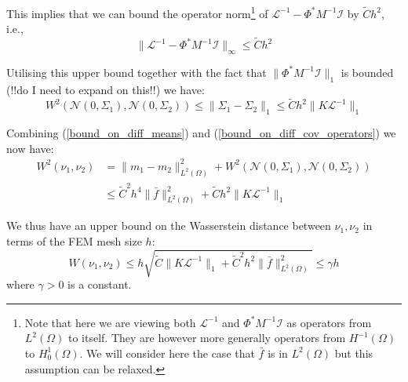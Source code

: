 This implies that we can bound the operator norm\footnote{Note that here we are viewing both $\mathcal{L}^{-1}$ and $\Phi^{*}M^{-1}\mathcal{I}$ as operators from $L^{2}(\Omega)$ to itself. They are however more generally operators from $H^{-1}(\Omega)$ to $H^{1}_{0}(\Omega)$. We will consider here the case that $\bar{f}$ is in $L^{2}(\Omega)$ but this assumption can be relaxed.} of $\mathcal{L}^{-1}-\Phi^{*}M^{-1}\mathcal{I}$ by $\tilde{C}h^{2}$, i.e.,
\begin{equation}
    \label{bound_on_diff_of_solution_operators}
    \|\mathcal{L}^{-1}-\Phi^{*}M^{-1}\mathcal{I}\|_{\infty}\leq \tilde{C}h^{2}
\end{equation}

Utilising this upper bound together with the fact that $\|\Phi^{*}M^{-1}\mathcal{I}\|_{1}$ is bounded (!!do I need to expand on this!!) we have:
\begin{equation}
    \label{bound_on_diff_cov_operators}
    W^{2}(\mathcal{N}(0,\Sigma_1),\mathcal{N}(0,\Sigma_2))\leq\|\Sigma_{1}-\Sigma_{2}\|_{1}\leq \tilde{C}h^{2}\|K\mathcal{L}^{-1}\|_{1}
\end{equation}

Combining (\ref{bound_on_diff_means}) and (\ref{bound_on_diff_cov_operators}) we now have:
\begin{align*}
    W^{2}(\nu_{1},\nu_{2})&=\|m_1-m_2\|_{L^{2}(\Omega)}^{2}+W^{2}(\mathcal{N}(0,\Sigma_1),\mathcal{N}(0,\Sigma_2)) \\
    &\leq \tilde{C}^{2}h^4\|\bar{f}\|^{2}_{L^{2}(\Omega)} + \tilde{C}h^{2}\|K\mathcal{L}^{-1}\|_{1}
\end{align*}

We thus have an upper bound on the Wasserstein distance between $\nu_{1},\nu_{2}$ in terms of the FEM mesh size $h$:
\begin{equation}
    \label{bound_on_distance}
    W(\nu_{1},\nu_{2})\leq h\sqrt{\tilde{C}\|K\mathcal{L}^{-1}\|_{1}+\tilde{C}^{2}h^{2}\|\bar{f}\|^{2}_{L^{2}(\Omega)}}\leq\gamma h
\end{equation}
where $\gamma>0$ is a constant.
